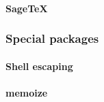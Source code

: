 \documentclass[a4paper, 11pt]{scrartcl}
\begin{document}
\paragraph{Sage\TeX}

\subsubsection{Special packages}
\paragraph{Shell escaping}

\paragraph{memoize}


\end{document}
